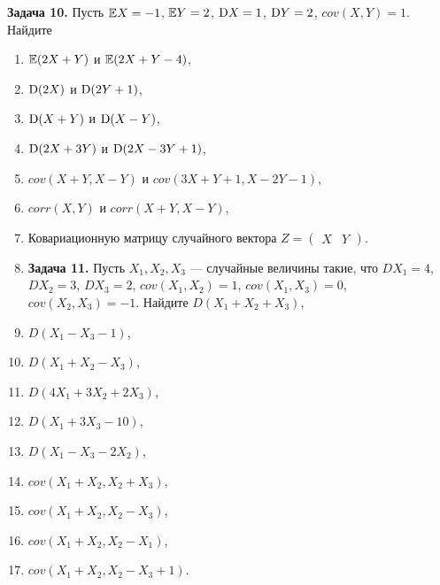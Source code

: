 \textbf{Задача 10.} Пусть ${\rm {\mathbb E}}X=-1$, ${\rm {\mathbb E}}Y=2$, ${\rm D}X=1$, ${\rm D}Y=2$, $cov(X,Y)=1$. Найдите

\begin{enumerate}
\item  ${\rm {\mathbb E}}(2X+Y)$ и ${\rm {\mathbb E}}(2X+Y-4)$,

\item  ${\rm D}(2X)$ и ${\rm D}(2Y+1)$,

\item  ${\rm D}(X+Y)$ и ${\rm D}(X-Y)$,

\item  ${\rm D}(2X+3Y)$ и ${\rm D}(2X-3Y+1)$,

\item  $cov(X+Y,X-Y)$ и $cov(3X+Y+1,X-2Y-1)$,

\item  $corr(X,Y)$ и $corr(X+Y,X-Y)$,

\item  Ковариационную матрицу случайного вектора $Z=(\begin{array}{cc} {X} & {Y} \end{array})$.

\item \textbf{Задача 11. }Пусть $X_{1} ,X_{2} ,X_{3} $  --- случайные величины такие, что $DX_{1} =4$, $DX_{2} =3$, $DX_{3} =2$, $cov(X_{1} ,X_{2} )=1$, $cov(X_{1} ,X_{3} )=0$, $cov(X_{2} ,X_{3} )=-1$. Найдите $D(X_{1} +X_{2} +X_{3} )$,

\item  $D(X_{1} -X_{3} -1)$,

\item  $D(X_{1} +X_{2} -X_{3} )$,

\item  $D(4X_{1} +3X_{2} +2X_{3} )$,

\item  $D(X_{1} +3X_{3} -10)$,

\item  $D(X_{1} -X_{3} -2X_{2} )$,

\item  $cov(X_{1} +X_{2} ,X_{2} +X_{3} )$,

\item  $cov(X_{1} +X_{2} ,X_{2} -X_{3} )$,

\item  $cov(X_{1} +X_{2} ,X_{2} -X_{1} )$,

\item  $cov(X_{1} +X_{2} ,X_{2} -X_{3} +1)$.
\end{enumerate}

